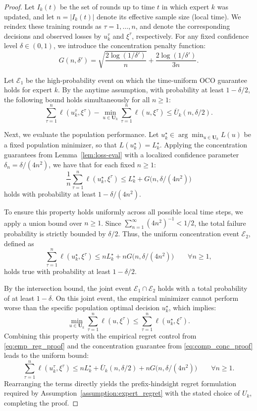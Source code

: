 \documentclass[a4paper,14pt]{extarticle}
\theoremstyle{plain}
\begin{document}
\begin{proof}
Let $I_k(t)$ be the set of rounds up to time $t$ in which expert $k$ was updated, and let $n = |I_k(t)|$ denote its effective sample size (local time). We reindex these training rounds as $\tau = 1, \dots, n$, and denote the corresponding decisions and observed losses by $u_k^\tau$ and $\xi^\tau$, respectively. For any fixed confidence level $\delta \in (0,1)$, we introduce the concentration penalty function:
\[
G(n, \delta') = \sqrt{\frac{2 \log(1/\delta')}{n}} + \frac{2 \log(1/\delta')}{3n}.
\]

Let $\mathcal{E}_1$ be the high-probability event on which the time-uniform OCO guarantee holds for expert $k$. By the anytime assumption, with probability at least $1-\delta/2$, the following bound holds simultaneously for all $n \ge 1$:
\begin{equation}
\label{eq:emp_reg_proof}
\sum_{\tau=1}^n \ell(u_k^\tau, \xi^\tau) - \min_{u \in \mathbf{U}_k}\sum_{\tau=1}^n \ell(u, \xi^\tau) \le \overline{U}_k(n, \delta/2).
\end{equation}

Next, we evaluate the population performance. Let $u_k^\star \in \arg \min_{u \in \mathbf{U}_k} L(u)$ be a fixed population minimizer, so that $L(u_k^\star) = L_k^\star$. Applying the concentration guarantees from Lemma~\ref{lem:loss-eval} with a localized confidence parameter $\delta_n = \delta/(4n^2)$, we have that for each fixed $n \ge 1$:
\[
\frac{1}{n}\sum_{\tau=1}^n \ell(u_k^\star, \xi^\tau) \le L_k^\star + G\bigl(n, \delta/(4n^2)\bigr)
\]
holds with probability at least $1-\delta/(4n^2)$.

To ensure this property holds uniformly across all possible local time steps, we apply a union bound over $n \ge 1$. Since $\sum_{n=1}^\infty (4n^2)^{-1} < 1/2$, the total failure probability is strictly bounded by $\delta/2$. Thus, the uniform concentration event $\mathcal{E}_2$, defined as
\begin{equation}
\label{eq:comp_conc_proof}
\sum_{\tau=1}^n \ell(u_k^\star, \xi^\tau) \le nL_k^\star + nG\bigl(n, \delta/(4n^2)\bigr) \qquad \forall n \ge 1,
\end{equation}
holds true with probability at least $1-\delta/2$.

By the intersection bound, the joint event $\mathcal{E}_1 \cap \mathcal{E}_2$ holds with a total probability of at least $1-\delta$. On this joint event, the empirical minimizer cannot perform worse than the specific population optimal decision $u_k^\star$, which implies:
\[
\min_{u \in \mathbf{U}_k}\sum_{\tau=1}^n \ell(u, \xi^\tau) \le \sum_{\tau=1}^n \ell(u_k^\star, \xi^\tau).
\]
Combining this property with the empirical regret control from \eqref{eq:emp_reg_proof} and the concentration guarantee from \eqref{eq:comp_conc_proof} leads to the uniform bound:
\[
\sum_{\tau=1}^n \ell(u_k^\tau, \xi^\tau) \le nL_k^\star + \overline{U}_k(n, \delta/2) + nG\bigl(n, \delta/(4n^2)\bigr) \qquad \forall n \ge 1.
\]
Rearranging the terms directly yields the prefix-hindsight regret formulation required by Assumption~\ref{assumption:expert_regret} with the stated choice of $U_k$, completing the proof.
\end{proof}
\end{document}
